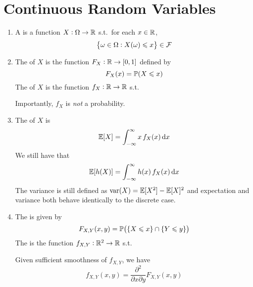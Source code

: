 \documentclass{styles/note}
\begin{document}
\newpage
\section{Continuous Random Variables}

  \begin{enumerate}[label=(\alph*)]
    \item A  is a function $X : \Omega \to \mathbb{R}$ s.t.~for each $x \in \mathbb{R}$,
      \[ \set{\omega \in \Omega : X(\omega) \leqslant x} \in \mathcal{F} \]
    
    \item The  of $X$ is the function $F_X : \mathbb{R} \to [0, 1]$ defined by
      \[ F_X(x) = \operatorname{\mathbb{P}}(X \leqslant x) \]
      The  of $X$ is the function $f_X : \mathbb{R} \to \mathbb{R}$ s.t.
      Importantly, $f_X$ is \emph{not} a probability.

    \item The  of $X$ is
      \begin{equation}
        \expectation[X] = \int_{-\infty}^\infty x\, f_X(x) \dif x
      \end{equation}
      We still have that
      \begin{equation}
        \expectation[h(X)] = \int_{-\infty}^\infty h(x)\, f_X(x) \dif x
      \end{equation}
      The variance is still defined as $\operatorname{var}(X) = \operatorname{\mathbb{E}}[X^2] - \operatorname{\mathbb{E}}[X]^2$ and expectation and variance both behave identically to the discrete case.

    \item The  is given by
      \[ F_{X, Y}(x, y) = \prob\left(\set{X \leqslant x} \cap \set{Y \leqslant y}\right) \]
      The  is the function $f_{X, Y} : \mathbb{R}^2 \to \mathbb{R}$ s.t.
      Given sufficient smoothness of $f_{X, Y}$, we have
      \begin{equation}
        f_{X, Y}(x, y) = \frac{\partial^2}{\partial x \partial y} F_{X, Y}(x, y)
      \end{equation}
      

\end{enumerate}
\end{document}
